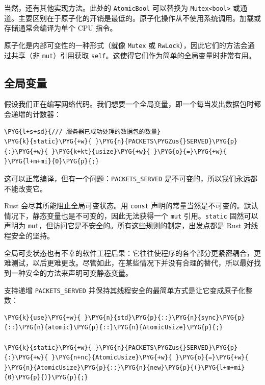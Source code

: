 当然，还有其他实现方法。此处的 \texttt{AtomicBool} 可以替换为 \texttt{Mutex<bool>} 或通道。主要区别在于原子化的开销是最低的。原子化操作从不使用系统调用。加载或存储通常会编译为单个 CPU 指令。

原子化是内部可变性的一种形式（就像 \texttt{Mutex} 或 \texttt{RwLock}），因此它们的方法会通过共享（非 \texttt{mut}）引用获取 \texttt{self}。这使得它们作为简单的全局变量时非常有用。

\subsection{全局变量}

假设我们正在编写网络代码。我们想要一个全局变量，即一个每当发出数据包时都会递增的计数器：

\begin{Verbatim}[commandchars=\\\{\},breaklines=true,breakanywhere=true,fontsize=\codefont,xleftmargin=17bp]
\PYG{l+s+sd}{/// 服务器已成功处理的数据包的数量}
\PYG{k}{static}\PYG{+w}{ }\PYG{n}{PACKETS\PYGZus{}SERVED}\PYG{p}{:}\PYG{+w}{ }\PYG{k+kt}{usize}\PYG{+w}{ }\PYG{o}{=}\PYG{+w}{ }\PYG{l+m+mi}{0}\PYG{p}{;}
\end{Verbatim}

这可以正常编译，但有一个问题：\texttt{PACKETS\_SERVED} 是不可变的，所以我们永远都不能改变它。

Rust 会尽其所能阻止全局可变状态。用 \texttt{const} 声明的常量当然是不可变的。默认情况下，静态变量也是不可变的，因此无法获得一个 \texttt{mut} 引用。\texttt{static} 固然可以声明为 \texttt{mut}，但访问它是不安全的。所有这些规则的制定，出发点都是 Rust 对线程安全的坚持。

全局可变状态也有不幸的软件工程后果：它往往使程序的各个部分更紧密耦合，更难测试，以后更难更改。尽管如此，在某些情况下并没有合理的替代，所以最好找到一种安全的方法来声明可变静态变量。

支持递增 \texttt{PACKETS\_SERVED} 并保持其线程安全的最简单方式是让它变成原子化整数：

\begin{Verbatim}[commandchars=\\\{\},breaklines=true,breakanywhere=true,fontsize=\codefont,xleftmargin=17bp]
\PYG{k}{use}\PYG{+w}{ }\PYG{n}{std}\PYG{p}{::}\PYG{n}{sync}\PYG{p}{::}\PYG{n}{atomic}\PYG{p}{::}\PYG{n}{AtomicUsize}\PYG{p}{;}

\PYG{k}{static}\PYG{+w}{ }\PYG{n}{PACKETS\PYGZus{}SERVED}\PYG{p}{:}\PYG{+w}{ }\PYG{n+nc}{AtomicUsize}\PYG{+w}{ }\PYG{o}{=}\PYG{+w}{ }\PYG{n}{AtomicUsize}\PYG{p}{::}\PYG{n}{new}\PYG{p}{(}\PYG{l+m+mi}{0}\PYG{p}{)}\PYG{p}{;}
\end{Verbatim}

